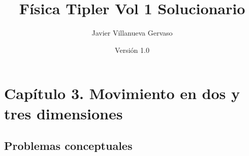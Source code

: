 \documentclass{article}
\title{Física Tipler Vol 1 Solucionario}
\author{Javier Villanueva Gervaso}
\date{Versión 1.0}
\begin{document}
\maketitle

\newpage

\tableofcontents

\newpage

\section{Capítulo 3. Movimiento en dos y tres dimensiones}

\subsection{Problemas conceptuales}
\end{document}
